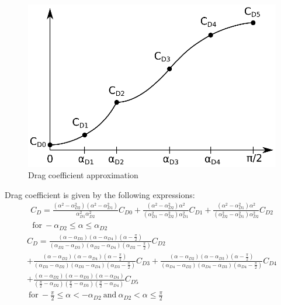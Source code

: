 \begin{figure}[h!]
  \centering
  \includegraphics[width=120mm]{eps/approx_cx.eps}
  \caption{Drag coefficient approximation}
\end{figure}

Drag coefficient is given by the following expressions:
\begin{multline}
  C_D =
  \frac{
    \left( \alpha^2 - \alpha_{D2}^2 \right)
    \left( \alpha^2 - \alpha_{D1}^2 \right)
  }
  {
    \alpha_{D1}^2 \alpha_{D2}^2
  } C_{D0}
  +
  \frac{
    \left( \alpha^2 - \alpha_{D2}^2 \right) \alpha^2
  }
  {
    \left( \alpha_{D1}^2 - \alpha_{D2}^2 \right) \alpha_{D1}^2
  } C_{D1}
  +
  \frac{
    \left( \alpha^2 - \alpha_{D1}^2 \right) \alpha^2
  }
  {
    \left( \alpha_{D2}^2 - \alpha_{D1}^2 \right) \alpha_{D2}^2
  } C_{D2} \\
  \mathrm{~for~} -\alpha_{D2} \leq \alpha \leq \alpha_{D2}
\end{multline}
\begin{multline}
  C_D =
  \frac{
    \left( \alpha - \alpha_{D3} \right)
    \left( \alpha - \alpha_{D4} \right)
    \left( \alpha - \frac{\pi}{2} \right)
  }
  {
    \left( \alpha_{D2} - \alpha_{D3} \right)
    \left( \alpha_{D2} - \alpha_{D4} \right)
    \left( \alpha_{D2} - \frac{\pi}{2} \right)
  } C_{D2}
  \\
  +
  \frac{
    \left( \alpha - \alpha_{D2} \right)
    \left( \alpha - \alpha_{D4} \right)
    \left( \alpha - \frac{\pi}{2} \right)
  }
  {
    \left( \alpha_{D3} - \alpha_{D2} \right)
    \left( \alpha_{D3} - \alpha_{D4} \right)
    \left( \alpha_{D3} - \frac{\pi}{2} \right)
  } C_{D3}
  +
  \frac{
    \left( \alpha - \alpha_{D2} \right)
    \left( \alpha - \alpha_{D3} \right)
    \left( \alpha - \frac{\pi}{2} \right)
  }
  {
    \left( \alpha_{D4} - \alpha_{D2} \right)
    \left( \alpha_{D4} - \alpha_{D3} \right)
    \left( \alpha_{D4} - \frac{\pi}{2} \right)
  } C_{D4}
  \\
  +
  \frac{
    \left( \alpha - \alpha_{D2} \right)
    \left( \alpha - \alpha_{D3} \right)
    \left( \alpha - \alpha_{D4} \right)
  }
  {
    \left( \frac{\pi}{2} - \alpha_{D2} \right)
    \left( \frac{\pi}{2} - \alpha_{D3} \right)
    \left( \frac{\pi}{2} - \alpha_{D4} \right)
  } C_{D5}
  \\
  \mathrm{~for~} -\frac{\pi}{2} \leq \alpha < -\alpha_{D2}
  \mathrm{~and~} \alpha_{D2} < \alpha \leq \frac{\pi}{2}
\end{multline}

